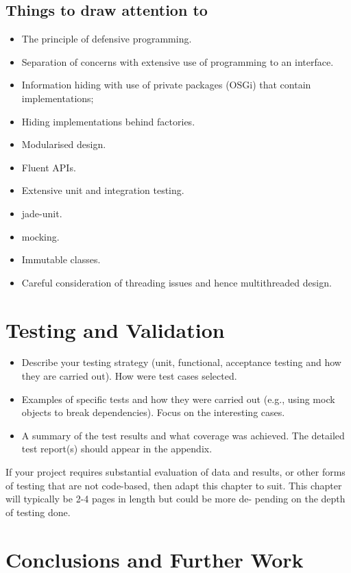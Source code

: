 \documentclass[ openright,titlepage,numbers=noenddot,headinclude,%
                footinclude=true,BCOR=5mm,paper=a4,fontsize=12pt,a4paper,english%
                ]{scrreprt}
\begin{document}
\section{Things to draw attention to}
\begin{itemize}
\item The principle of defensive programming.
\item Separation of concerns with extensive use of programming to an interface.
\item Information hiding with use of private packages (OSGi) that contain implementations;
\item Hiding implementations behind factories.
\item Modularised design.
\item Fluent APIs.
\item Extensive unit and integration testing.
\item jade-unit.
\item mocking.
\item Immutable classes.
\item Careful consideration of threading issues and hence multithreaded design.

\end{itemize}


\chapter{Testing and Validation}
\label{Chapters/Testing-and-Validation}

\begin{itemize}
\item Describe your testing strategy (unit, functional, acceptance testing
and how they are carried out). How were test cases selected.
\item Examples of specific tests and how they were carried out (e.g., using mock objects to break dependencies). Focus on the interesting cases.
\item A summary of the test results and what coverage was achieved. The detailed test report(s) should appear in the appendix.
\end{itemize}

If your project requires substantial evaluation of data and results, or other forms of testing that are not code-based, then adapt this chapter to suit.
This chapter will typically be 2-4 pages in length but could be more de- pending on the depth of testing done.

\chapter{Conclusions and Further Work}
\label{Chapters/Conclusion-and-Further-Work}
\end{document}

